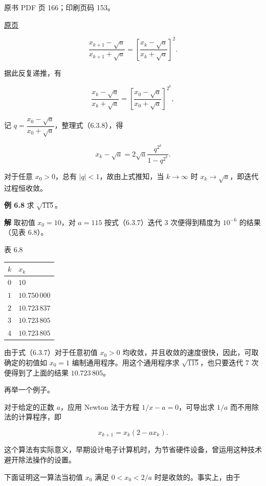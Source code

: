 \clearpage

原书 PDF 页 166；印刷页码 153。

\href{source-images/pdf-166.jpeg}{原页}

\[
\frac{x_{k+1}-\sqrt{a}}{x_{k+1}+\sqrt{a}}=\left[\frac{x_k-\sqrt{a}}{x_k+\sqrt{a}}\right]^2.
\]

据此反复递推，有

\[
\frac{x_k-\sqrt{a}}{x_k+\sqrt{a}}=\left[\frac{x_0-\sqrt{a}}{x_0+\sqrt{a}}\right]^{2^k},
\tag{6.3.8}
\]

记 \(q=\dfrac{x_0-\sqrt{a}}{x_0+\sqrt{a}}\)，整理式（6.3.8），得

\[
x_k-\sqrt{a}=2\sqrt{a}\frac{q^{2^k}}{1-q^{2^k}}.
\]

对于任意 \(x_0>0\)，总有 \(|q|<1\)，故由上式推知，当 \(k\to\infty\) 时 \(x_k\to\sqrt{a}\)，即迭代过程恒收敛。

\textbf{例 6.8} 求 \(\sqrt{115}\)。

\textbf{解} 取初值 \(x_0=10\)，对 \(a=115\) 按式（6.3.7）迭代 3 次便得到精度为 \(10^{-6}\) 的结果（见表 6.8）。

表 6.8

{\def\LTcaptype{none} %
\begin{longtable}[]{@{}ll@{}}
\toprule\noalign{}
\(k\) & \(x_k\) \\
\midrule\noalign{}
\endhead
\bottomrule\noalign{}
\endlastfoot
\(0\) & \(10\) \\
\(1\) & \(10.750\,000\) \\
\(2\) & \(10.723\,837\) \\
\(3\) & \(10.723\,805\) \\
\(4\) & \(10.723\,805\) \\
\end{longtable}
}

由于式（6.3.7）对于任意初值 \(x_0>0\) 均收敛，并且收敛的速度很快，因此，可取确定的初值如 \(x_0=1\) 编制通用程序。用这个通用程序求 \(\sqrt{115}\)，也只要迭代 7 次便得到了上面的结果 \(10.723\,805\)。

再举一个例子。

对于给定的正数 \(a\)，应用 Newton 法于方程 \(1/x-a=0\)，可导出求 \(1/a\) 而不用除法的计算程序，即

\[
x_{k+1}=x_k(2-ax_k).
\]

这个算法有实际意义，早期设计电子计算机时，为节省硬件设备，曾运用这种技术避开除法操作的设置。

下面证明这一算法当初值 \(x_0\) 满足 \(0<x_0<2/a\) 时是收敛的。事实上，由于

